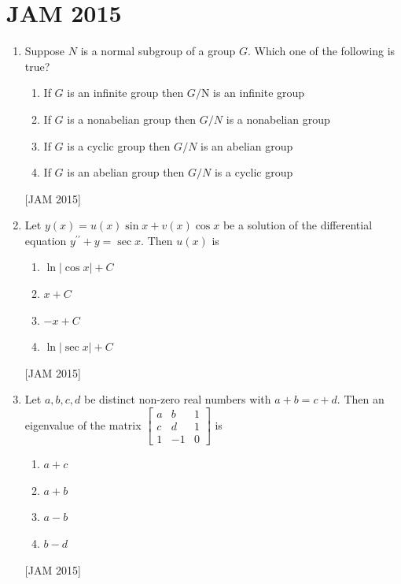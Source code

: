\section{JAM 2015}
\begin{enumerate}


 
\item  Suppose $N$ is a normal subgroup of a group $G$. Which one of the following is true? 
\begin{enumerate}
   \item If $G$ is an infinite group then $G / \mathrm{N}$ is an infinite group 
\item If $G$ is a nonabelian group then $G / N$ is a nonabelian group 
\item If $G$ is a cyclic group then $G / N$ is an abelian group 
\item If $G$ is an abelian group then $G / N$ is a cyclic group
 
\end{enumerate}
\hfill [JAM 2015]




\item  Let $y(x)=u(x) \sin x+v(x) \cos x$ be a solution of the differential equation $y^{\prime \prime}+y=\sec x$. Then $u(x)$ is 

\begin{enumerate}
    
\item $\ln |\cos x|+C$ 
\item $x+C$ 
\item $-x+C$ 
\item $\ln |\sec x|+C$
\end{enumerate}
\hfill [JAM 2015]



\item  Let $a, b, c, d$ be distinct non-zero real numbers with $a+b=c+d$. Then an eigenvalue of the matrix $\left[\begin{array}{ccc}a & b & 1 \\ c & d & 1 \\ 1 & -1 & 0\end{array}\right]$ is 
\begin{enumerate}
   \item $a+c$ 
\item $a+b$ 
\item $a-b$ 
\item $b-d$ 
\end{enumerate}
\hfill [JAM 2015]






\end{enumerate}
